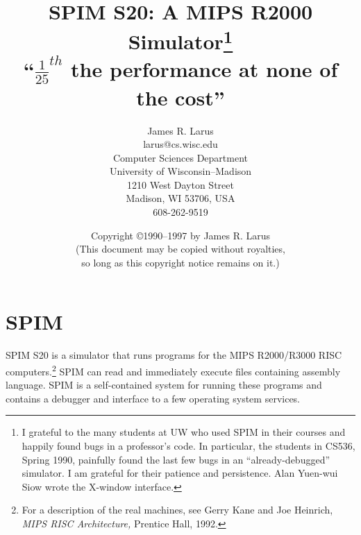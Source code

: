 \documentclass[11pt]{article}
\begin{document}
\title{SPIM S20: A MIPS R2000 Simulator\thanks
{I grateful to the many students at UW who used SPIM in their courses
and happily found bugs in a professor's code.  In particular, the
students in CS536, Spring 1990, painfully found the last few bugs in
an ``already-debugged'' simulator.  I am grateful for their patience
and persistence.  Alan Yuen-wui Siow wrote the X-window interface.}
\\
{\small ``$\frac{1}{25}^{th}$ the performance at none of 	the
cost''}}

\author{{\normalsize James R. Larus} \\
	{\normalsize larus@cs.wisc.edu} \\
	{\normalsize Computer Sciences Department} \\
	{\normalsize University of Wisconsin--Madison} \\
	{\normalsize 1210 West Dayton Street} \\
	{\normalsize Madison, WI 53706, USA} \\
	{\normalsize 608-262-9519}}

\date{Copyright \copyright 1990--1997 by James R. Larus \\
      (This document may be copied without royalties, \\
	so long as this copyright notice remains on it.)}

\maketitle


\newcommand {\pinst} [2]%
	{\bigskip\noindent{\em{{\tt #1}\hfill#2 ${}^{\dagger}$\newline}}}
\newcommand {\inst} [2]%
	 {\bigskip\noindent{\em{{\tt #1}\hfill#2\newline}}}
\newcommand {\pinstX} [2]%
	{\noindent{\em{{\tt #1}\hfill#2 ${}^{\dagger}$\newline}}}
\newcommand {\instX} [2]%
	{\noindent{\em{{\tt #1}\hfill#2\newline}}}


\section{SPIM}

SPIM S20 is a simulator that runs programs for the MIPS R2000/R3000 RISC
computers.\footnote{For a description of the real machines, see Gerry Kane
and Joe Heinrich, {\em MIPS RISC Architecture,\/} Prentice Hall, 1992.} SPIM
can read and immediately execute files containing assembly language.  SPIM
is a self-contained system for running these programs and contains a
debugger and interface to a few operating system services.
\end{document}
